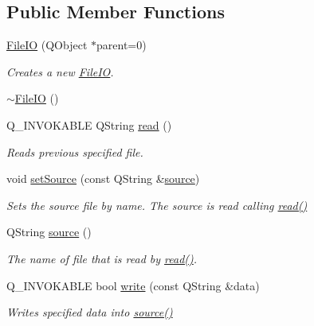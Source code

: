 \subsection*{Public Member Functions}
\begin{DoxyCompactItemize}
\item 
\hyperlink{class_file_i_o_a6e4f7122f89b633e3522c2e1d31e1fdd}{File\+I\+O} (Q\+Object $\ast$parent=0)
\begin{DoxyCompactList}\small\item\em Creates a new \hyperlink{class_file_i_o}{File\+I\+O}. \end{DoxyCompactList}\item 
\hyperlink{class_file_i_o_adc3caa8f1e5d76274d8ffb8b5c17288b}{$\sim$\+File\+I\+O} ()
\item 
Q\+\_\+\+I\+N\+V\+O\+K\+A\+B\+L\+E Q\+String \hyperlink{class_file_i_o_a48c90efc3bf8dda4d612f2dff5409834}{read} ()
\begin{DoxyCompactList}\small\item\em Reads previous specified file. \end{DoxyCompactList}\item 
void \hyperlink{class_file_i_o_a985a2cce4d400bca160c5f42bf697adb}{set\+Source} (const Q\+String \&\hyperlink{class_file_i_o_ad4467aa6c50748ac1e7076d25dcd33cc}{source})
\begin{DoxyCompactList}\small\item\em Sets the source file by name. The source is read calling \hyperlink{class_file_i_o_a48c90efc3bf8dda4d612f2dff5409834}{read()} \end{DoxyCompactList}\item 
Q\+String \hyperlink{class_file_i_o_a8da2b4c6cd72af512e4556203c1c66e7}{source} ()
\begin{DoxyCompactList}\small\item\em The name of file that is read by \hyperlink{class_file_i_o_a48c90efc3bf8dda4d612f2dff5409834}{read()}. \end{DoxyCompactList}\item 
Q\+\_\+\+I\+N\+V\+O\+K\+A\+B\+L\+E bool \hyperlink{class_file_i_o_a73bc6cac958f024325e795a690740a85}{write} (const Q\+String \&data)
\begin{DoxyCompactList}\small\item\em Writes specified data into \hyperlink{class_file_i_o_a8da2b4c6cd72af512e4556203c1c66e7}{source()} \end{DoxyCompactList}\end{DoxyCompactItemize}
